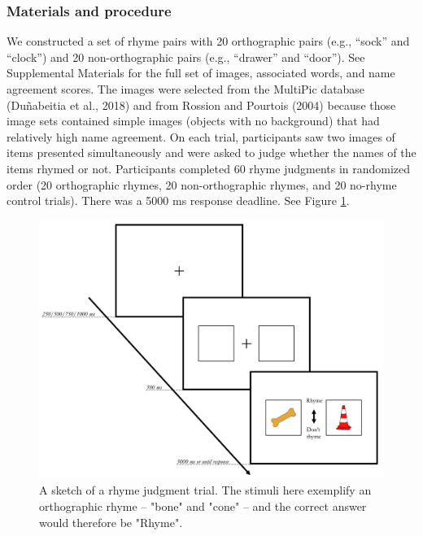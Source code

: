 \documentclass[
  man,a4paper,floatsintext]{apa6}
\begin{document}
\hypertarget{materials-and-procedure-1}{%
\subsubsection{Materials and procedure}\label{materials-and-procedure-1}}

We constructed a set of rhyme pairs with 20 orthographic pairs (e.g., ``sock'' and ``clock'') and 20 non-orthographic pairs (e.g., ``drawer'' and ``door''). See Supplemental Materials for the full set of images, associated words, and name agreement scores. The images were selected from the MultiPic database (Duñabeitia et al., 2018) and from Rossion and Pourtois (2004) because those image sets contained simple images (objects with no background) that had relatively high name agreement. On each trial, participants saw two images of items presented simultaneously and were asked to judge whether the names of the items rhymed or not. Participants completed 60 rhyme judgments in randomized order (20 orthographic rhymes, 20 non-orthographic rhymes, and 20 no-rhyme control trials). There was a 5000 ms response deadline. See Figure \ref{fig:rhyme-procedure}.

\newpage

\begin{figure}[!ht]
\includegraphics[width=1\linewidth]{../figures/rhyme} \caption{A sketch of a rhyme judgment trial. The stimuli here exemplify an orthographic rhyme – "bone" and "cone" – and the correct answer would therefore be "Rhyme".}\label{fig:rhyme-procedure}
\end{figure}
\end{document}
